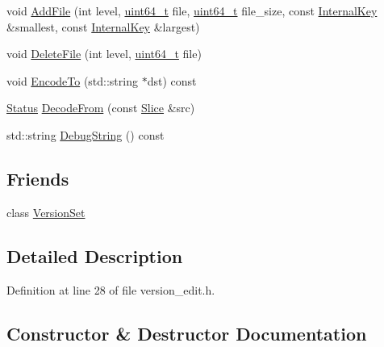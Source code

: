 \begin{DoxyCompactItemize}
void \hyperlink{classleveldb_1_1_version_edit_a4cd5cc92761b7ae5b5f9cff46cb88263}{Add\+File} (int level, \hyperlink{stdint_8h_aaa5d1cd013383c889537491c3cfd9aad}{uint64\+\_\+t} file, \hyperlink{stdint_8h_aaa5d1cd013383c889537491c3cfd9aad}{uint64\+\_\+t} file\+\_\+size, const \hyperlink{classleveldb_1_1_internal_key}{Internal\+Key} \&smallest, const \hyperlink{classleveldb_1_1_internal_key}{Internal\+Key} \&largest)
\item 
void \hyperlink{classleveldb_1_1_version_edit_ac222bfd1055114d57aadbd124f24ad0c}{Delete\+File} (int level, \hyperlink{stdint_8h_aaa5d1cd013383c889537491c3cfd9aad}{uint64\+\_\+t} file)
\item 
void \hyperlink{classleveldb_1_1_version_edit_aa3161c67223f6c5e843be579a8456086}{Encode\+To} (std\+::string $\ast$dst) const 
\item 
\hyperlink{classleveldb_1_1_status}{Status} \hyperlink{classleveldb_1_1_version_edit_ac0f431c5e8f08c74c697d8480f7c005f}{Decode\+From} (const \hyperlink{classleveldb_1_1_slice}{Slice} \&src)
\item 
std\+::string \hyperlink{classleveldb_1_1_version_edit_aa186529f0124867251964b2346b58b1f}{Debug\+String} () const 
\end{DoxyCompactItemize}
\subsection*{Friends}
\begin{DoxyCompactItemize}
\item 
class \hyperlink{classleveldb_1_1_version_edit_a1827cd1b4d6e9e3c378ce37ca3cce635}{Version\+Set}
\end{DoxyCompactItemize}


\subsection{Detailed Description}


Definition at line 28 of file version\+\_\+edit.\+h.



\subsection{Constructor \& Destructor Documentation}
\hypertarget{classleveldb_1_1_version_edit_a60dd9c72d256ed1bda68597a9263333e}{}
